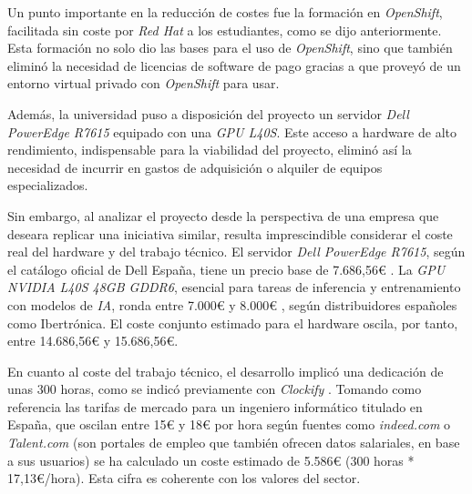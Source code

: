 Un punto importante en la reducción de costes fue la formación en \textit{OpenShift}, facilitada sin coste por \textit{Red Hat} a los estudiantes, como se dijo anteriormente. Esta formación no solo dio las bases para el uso de \textit{OpenShift}, sino que también eliminó la necesidad de licencias de software de pago gracias a que proveyó de un entorno virtual privado con \textit{OpenShift} para usar.

Además, la universidad puso a disposición del proyecto un servidor \textit{Dell PowerEdge R7615} equipado con una \textit{GPU L40S}. Este acceso a hardware de alto rendimiento, indispensable para la viabilidad del proyecto, eliminó así la necesidad de incurrir en gastos de adquisición o alquiler de equipos especializados.

Sin embargo, al analizar el proyecto desde la perspectiva de una empresa que deseara replicar una iniciativa similar, resulta imprescindible considerar el coste real del hardware y del trabajo técnico. El servidor \textit{Dell PowerEdge R7615}, según el catálogo oficial de Dell España, tiene un precio base de 7.686,56€ \cite{ref45}. La \textit{GPU NVIDIA L40S 48GB GDDR6}, esencial para tareas de inferencia y entrenamiento con modelos de \textit{IA}, ronda entre 7.000€ y 8.000€ \cite{ref46}, según distribuidores españoles como Ibertrónica. El coste conjunto estimado para el hardware oscila, por tanto, entre 14.686,56€ y 15.686,56€.

En cuanto al coste del trabajo técnico, el desarrollo implicó una dedicación de unas 300 horas, como se indicó previamente con \textit{Clockify} \cite{ref35}. Tomando como referencia las tarifas de mercado para un ingeniero informático titulado en España, que oscilan entre 15€ y 18€ por hora según fuentes como \textit{indeed.com} o \textit{Talent.com} \cite{ref47,ref48} (son portales de empleo que también ofrecen datos salariales, en base a sus usuarios) se ha calculado un coste estimado de 5.586€ (300 horas * 17,13€/hora). Esta cifra es coherente con los valores del sector.

